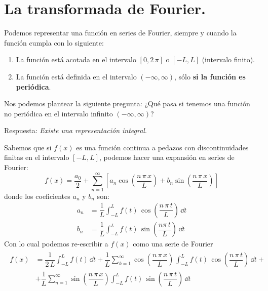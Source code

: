\section{La transformada de Fourier.}
Podemos representar una función en series de Fourier, siempre y cuando la función cumpla con lo siguiente:
\begin{enumerate}[label=\alph*)]
\item La función está acotada en el intervalo $[0, 2 \, \pi]$ o $[-L, L]$ (intervalo finito).
\item La función está definida en el intervalo $(- \infty, \infty)$, sólo \textbf{si la función es periódica}.
\end{enumerate}
Nos podemos plantear la siguiente pregunta: ¿Qué pasa si tenemos una función no periódica en el intervalo infinito $(-\infty, \infty)$?
\par
Respuesta: \emph{Existe una representación integral}.
\par
Sabemos que si $f(x)$ es una función continua a pedazos con discontinuidades finitas en el intervalo $[-L, L]$, podemos hacer una expansión en series de Fourier:
\begin{equation}
f(x) = \dfrac{a_{0}}{2} + \sum_{n=1}^{\infty} \left[ a_{n} \cos \left( \dfrac{n \, \pi \, x}{L} \right) + b_{n} \sin \left( \dfrac{n \, \pi \, x}{L} \right) \right]
\label{eq:8_11}
\end{equation}
donde los coeficientes $a_{n}$ y $b_{n}$ son:
\begin{align}
a_{n} &= \dfrac{1}{L} \int_{-L}^{L} f(t) \, \cos \left( \dfrac{n \, \pi \, t}{L} \right) \, \dd{t} \label{eq:15_12} \\[0.5em]
b_{n} &= \dfrac{1}{L} \int_{-L}^{L} f(t) \, \sin \left( \dfrac{n \pi \, t}{L} \right) \, \dd{t}
\label{eq:ecuacion_15_13}
\end{align}
Con lo cual podemos re-escribir a $f(x)$ como una serie de Fourier
\begin{align}
\begin{aligned}
f(x) &= \dfrac{1}{2 \, L} \int_{-L}^{L} f(t) \, \dd{t} + \dfrac{1}{L} \sum_{k=1}^{\infty} \cos \left( \dfrac{n \, \pi \, x}{L} \right) \, \int_{-L}^{L} f(t) \, \cos \left( \dfrac{n \, \pi \, t}{L} \right) \, \dd{t} + \\
&+ \dfrac{1}{L} \sum_{n=1}^{\infty}  \sin \left( \dfrac{n \, \pi \, x}{L} \right) \int_{-L}^{L} f(t) \, \sin \left( \dfrac{n \, \pi \, t}{L} \right) \, \dd{t}
\label{eq:ecuacion_15_14}
\end{aligned}
\end{align}
